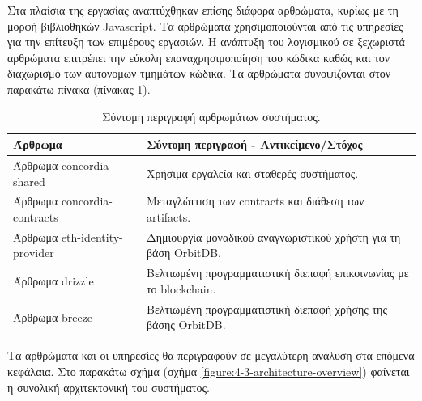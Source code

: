 Στα πλαίσια της εργασίας αναπτύχθηκαν επίσης διάφορα αρθρώματα, κυρίως με τη μορφή βιβλιοθηκών Javascript. Τα αρθρώματα χρησιμοποιούνται από τις υπηρεσίες για την επίτευξη των επιμέρους εργασιών. Η ανάπτυξη του λογισμικού σε ξεχωριστά αρθρώματα επιτρέπει την εύκολη επαναχρησιμοποίηση του κώδικα καθώς και τον διαχωρισμό των αυτόνομων τμημάτων κώδικα. Τα αρθρώματα συνοψίζονται στον παρακάτω πίνακα (πίνακας \ref{table:4-3-software-units-summary}).

\begin{table}[H]
    \begin{center}
        \begin{tabularx}{\textwidth}{l X}
            \toprule
            \textbf{Άρθρωμα} & \textbf{Σύντομη περιγραφή - Αντικείμενο/Στόχος} \\
            \midrule
            Άρθρωμα concordia-shared      & Χρήσιμα εργαλεία και σταθερές συστήματος. \\ [0.5ex]
            Άρθρωμα concordia-contracts   & Μεταγλώττιση των contracts και διάθεση των artifacts. \\ [0.5ex]
            Άρθρωμα eth-identity-provider & Δημιουργία μοναδικού αναγνωριστικού χρήστη για τη βάση OrbitDB. \\ [0.5ex]
            Άρθρωμα drizzle               & Βελτιωμένη προγραμματιστική διεπαφή επικοινωνίας με το blockchain. \\ [0.5ex]
            Άρθρωμα breeze                & Βελτιωμένη προγραμματιστική διεπαφή χρήσης της βάσης OrbitDB. \\ [0.5ex]
            \bottomrule
        \end{tabularx}
    \end{center}
    \caption{Σύντομη περιγραφή αρθρωμάτων συστήματος.}
    \label{table:4-3-software-units-summary}
\end{table}

Τα αρθρώματα και οι υπηρεσίες θα περιγραφούν σε μεγαλύτερη ανάλυση στα επόμενα κεφάλαια. Στο παρακάτω σχήμα (σχήμα \ref{figure:4-3-architecture-overview}) φαίνεται η συνολική αρχιτεκτονική του συστήματος.

